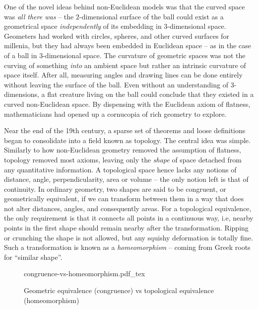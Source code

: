 One of the novel ideas behind non-Euclidean models was that the curved space was \emph{all there was} -- the $2$-dimensional surface of the ball could exist as a geometrical space \emph{independently} of its embedding in $3$-dimensional space.
Geometers had worked with circles, spheres, and other curved surfaces for millenia, but they had always been embedded in Euclidean space -- as in the case of a ball in $3$-dimensional space. 
The curvature of geometric spaces was not the curving of something \emph{into} an ambient space but rather an intrinsic curvature of space itself. After all, measuring angles and drawing lines can be done entirely without leaving the surface of the ball. Even without an understanding of $3$-dimensions, a flat creature living on the ball could conclude that they existed in a curved non-Euclidean space.
By dispensing with the Euclidean axiom of flatness, mathematicians had opened up a cornucopia of rich geometry to explore.
%

Near the end of the 19th century, a sparse set of theorems and loose definitions began to consolidate into a field known as topology. The central idea was simple. Similarly to how non-Euclidean geometry removed the assumption of flatness, topology removed most axioms, leaving only the \emph{shape} of space detached from any quantitative information.
A topological space hence lacks any notions of distance, angle, perpendicularity, area or volume -- the only notion left is that of continuity.
In ordinary geometry, two shapes are said to be congruent, or geometrically equivalent, if we can transform between them in a way that does not alter distances, angles, and consequently areas.
For a topological equivalence, the only requirement is that it connects all points in a continuous way, i.e, nearby points in the first shape should remain nearby after the transformation. Ripping or crunching the shape is not allowed, but any squishy deformation is totally fine. Such a transformation is known as a \emph{homeomorphism} -- coming from Greek roots for ``similar shape''.
\begin{figure}[ht]
	\centering
	{congruence-vs-homeomorphism.pdf_tex}
	\caption{Geometric equivalence (congruence) vs topological equivalence (homeomorphism)}\label{fig:first}
\end{figure}

